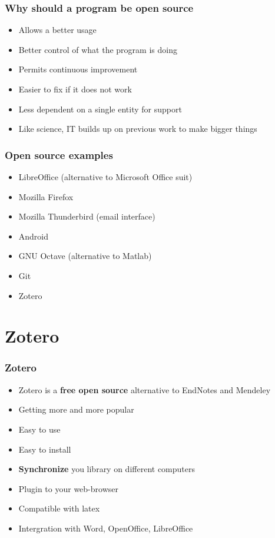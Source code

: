 \documentclass{beamer}
\begin{document}
\begin{frame}
\frametitle{Why should a program be open source}
\begin{itemize}
\item Allows a better usage 
\item Better control of what the program is doing
\item Permits continuous improvement
\item Easier to fix if it does not work
\item Less dependent on a single entity for support
\item Like science, IT builds up on previous work to make bigger things
\end{itemize}
\end{frame}

\begin{frame}
\frametitle{Open source examples}
\begin{itemize}
\item LibreOffice (alternative to Microsoft Office suit)
\item Mozilla Firefox 
\item Mozilla Thunderbird (email interface)
\item Android
\item GNU Octave (alternative to Matlab)
\item Git
\item Zotero
\end{itemize}
\end{frame}


\section{Zotero}
\begin{frame}
\frametitle{Zotero}
\begin{itemize}
\item Zotero is a \textbf{free open source} alternative to EndNotes and Mendeley
\item Getting more and more popular
\item Easy to use
\item Easy to install
\item \textbf{Synchronize} you library on different computers
\item Plugin to your web-browser
\item Compatible with latex
\item Intergration with Word, OpenOffice, LibreOffice
\end{itemize}
\end{frame}
\end{document}

